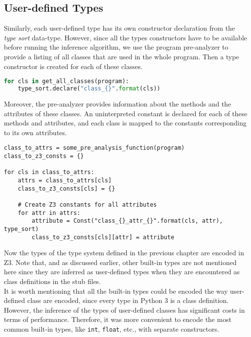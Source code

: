 \subsection{User-defined Types}
Similarly, each user-defined type has its own constructor declaration from the \textit{type sort} data-type. However, since all the types constructors have to be available before running the inference algorithm, we use the program pre-analyzer to provide a listing of all classes that are used in the whole program. Then a type constructor is created for each of these classes. 

\begin{lstlisting}[language=python]
for cls in get_all_classes(program):
	type_sort.declare("class_{}".format(cls))
\end{lstlisting}
Moreover, the pre-analyzer provides information about the methods and the attributes of these classes. An uninterpreted constant is declared for each of these methods and attributes, and each class is mapped to the constants corresponding to its own attributes.

\begin{lstlisting}
class_to_attrs = some_pre_analysis_function(program)
class_to_z3_consts = {}

for cls in class_to_attrs:
    attrs = class_to_attrs[cls]
    class_to_z3_consts[cls] = {}
    
    # Create Z3 constants for all attributes
    for attr in attrs:
	    attribute = Const("class_{}_attr_{}".format(cls, attr), type_sort)
	    class_to_z3_consts[cls][attr] = attribute
\end{lstlisting}

Now the types of the type system defined in the previous chapter are encoded in Z3. Note that, and as discussed earlier, other built-in types are not mentioned here since they are inferred as user-defined types when they are encountered as class definitions in the stub files.\\

It is worth mentioning that all the built-in types could be encoded the way user-defined class are encoded, since every type in Python 3 is a class definition. However, the inference of the types of user-defined classes has significant costs in terms of performance. Therefore, it was more convenient to encode the most common built-in types, like \lstinline|int|, \lstinline|float|, etc., with separate constructors.


